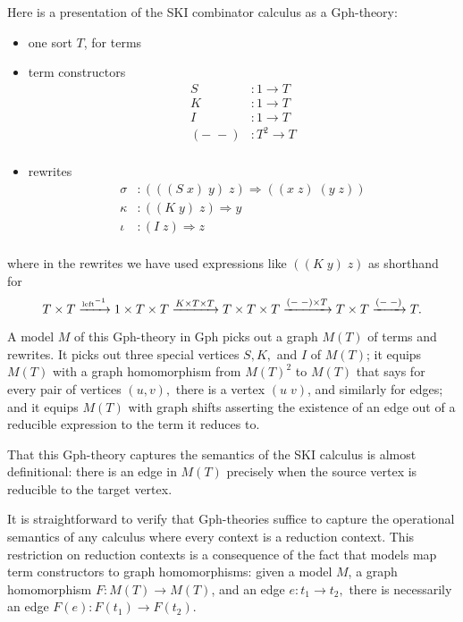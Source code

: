 \documentclass{llncs}
\newcommand{\maps}{\colon}
\begin{document}
Here is a presentation of the SKI combinator calculus as a Gph-theory:
\begin{itemize}
  \item one sort $T$, for terms
  \item term constructors
  \[\begin{array}{rl}
    S&:1 \to T\\
    K&:1 \to T\\
    I&:1 \to T\\
    (-\; -)&: T^2 \to T\\
  \end{array}\]
  \item rewrites
  \[\begin{array}{rl}
    \sigma&:(((S\; x)\; y)\; z) \Rightarrow ((x\; z)\; (y\; z))\\
    \kappa&:((K\; y)\; z) \Rightarrow y\\
    \iota&:(I\; z) \Rightarrow z\\
  \end{array}\]
\end{itemize}
where in the rewrites we have used expressions like $((K\; y)\; z)$ as shorthand for
\[ T\times T \xrightarrow{\tiny\mbox{left}^{-1}} 1\times T \times T \xrightarrow{K \times T \times T} T\times T \times T \xrightarrow{(-\;-)\times T} T\times T \xrightarrow{(-\;-)} T. \]

A model $M$ of this Gph-theory in Gph picks out a graph $M(T)$ of terms and rewrites.  It picks out three special vertices $S,K,$ and $I$ of $M(T)$; it equips $M(T)$ with a graph homomorphism from $M(T)^2$ to $M(T)$ that says for every pair of vertices $(u,v),$ there is a vertex $(u\;v)$, and similarly for edges; and it equips $M(T)$ with graph shifts asserting the existence of an edge out of a reducible expression to the term it reduces to.

That this Gph-theory captures the semantics of the SKI calculus is almost definitional: there is an edge in $M(T)$ precisely when the source vertex is reducible to the target vertex.  

It is straightforward to verify that Gph-theories suffice to capture the operational semantics of any calculus where every context is a reduction context.  This restriction on reduction contexts is a consequence of the fact that models map term constructors to graph homomorphisms: given a model $M$, a graph homomorphism $F\maps M(T) \to M(T)$, and an edge $e\maps t_1 \to t_2,$ there is necessarily an edge $F(e)\maps F(t_1) \to F(t_2).$
\end{document}

